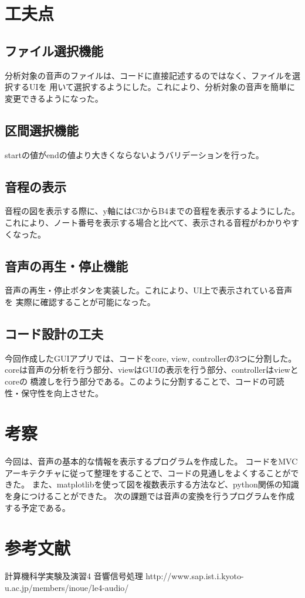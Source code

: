 \documentclass[a4paper,11pt]{jsarticle}
\begin{document}
\section{工夫点}
\subsection{ファイル選択機能}
分析対象の音声のファイルは、コードに直接記述するのではなく、ファイルを選択するUIを
用いて選択するようにした。これにより、分析対象の音声を簡単に変更できるようになった。

\subsection{区間選択機能}
startの値がendの値より大きくならないようバリデーションを行った。

\subsection{音程の表示}
音程の図を表示する際に、y軸にはC3からB4までの音程を表示するようにした。
これにより、ノート番号を表示する場合と比べて、表示される音程がわかりやすくなった。

\subsection{音声の再生・停止機能}
音声の再生・停止ボタンを実装した。これにより、UI上で表示されている音声を
実際に確認することが可能になった。

\subsection{コード設計の工夫}
今回作成したGUIアプリでは、コードをcore, view, controllerの3つに分割した。
coreは音声の分析を行う部分、viewはGUIの表示を行う部分、controllerはviewとcoreの
橋渡しを行う部分である。このように分割することで、コードの可読性・保守性を向上させた。

\section{考察}
今回は、音声の基本的な情報を表示するプログラムを作成した。
コードをMVCアーキテクチャに従って整理をすることで、コードの見通しをよくすることができた。
また、matplotlibを使って図を複数表示する方法など、python関係の知識を身につけることができた。
次の課題では音声の変換を行うプログラムを作成する予定である。


\section{参考文献}
計算機科学実験及演習4 音響信号処理\newline
http://www.sap.ist.i.kyoto-u.ac.jp/members/inoue/le4-audio/
\end{document}

